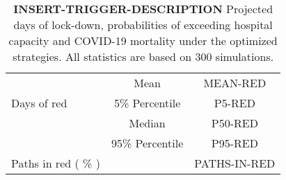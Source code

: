 \documentclass{article}
\begin{document}
\begin{table}[!htb]
\begin{tabular}{p{4cm}cc}
		\multirow{3}{*}{Days of red} & Mean      & MEAN-RED                        \\ \cmidrule(l){2-3} 
		& 5\% Percentile    & P5-RED                     \\ \cmidrule(l){2-3} 
		& Median    & P50-RED                      \\ \cmidrule(l){2-3} 
		& 95\% Percentile    & P95-RED                     \\   \midrule   
		\multirow{1}{*}{Paths in red ( \% )} &      &         PATHS-IN-RED            \\  \bottomrule
	\end{tabular}
	\caption{\textbf{INSERT-TRIGGER-DESCRIPTION} 
		 Projected days of lock-down, probabilities of exceeding hospital capacity and COVID-19 mortality under the optimized strategies. All statistics are based on 300 simulations.}
	\label{table:summary_table_tiers}
\end{table}   
\end{document}
